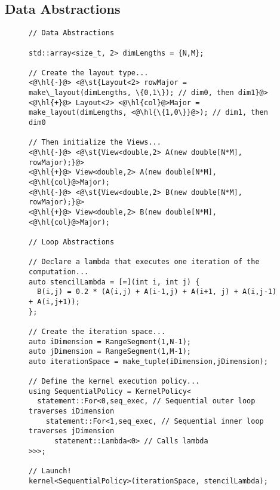 \subsection{Data Abstractions}
\begin{figure}
\begin{lstlisting}[caption={Diff for applying global layout transformations in RAJA version of 5-point stencil code. The new code uses column-major instead of row-major.}, label=stencilRAJADiff]
// Data Abstractions

std::array<size_t, 2> dimLengths = {N,M};

// Create the layout type...
<@\hl{-}@> <@\st{Layout<2> rowMajor = make\_layout(dimLengths, \{0,1\}); // dim0, then dim1}@>
<@\hl{+}@> Layout<2> <@\hl{col}@>Major = make_layout(dimLengths, <@\hl{\{1,0\}}@>); // dim1, then dim0

// Then initialize the Views...
<@\hl{-}@> <@\st{View<double,2> A(new double[N*M], rowMajor);}@>
<@\hl{+}@> View<double,2> A(new double[N*M], <@\hl{col}@>Major); 
<@\hl{-}@> <@\st{View<double,2> B(new double[N*M], rowMajor);}@>
<@\hl{+}@> View<double,2> B(new double[N*M], <@\hl{col}@>Major);

// Loop Abstractions

// Declare a lambda that executes one iteration of the computation...
auto stencilLambda = [=](int i, int j) {
  B(i,j) = 0.2 * (A(i,j) + A(i-1,j) + A(i+1, j) + A(i,j-1) + A(i,j+1));
};

// Create the iteration space...
auto iDimension = RangeSegment(1,N-1);
auto jDimension = RangeSegment(1,M-1);
auto iterationSpace = make_tuple(iDimension,jDimension);

// Define the kernel execution policy...
using SequentialPolicy = KernelPolicy<
  statement::For<0,seq_exec, // Sequential outer loop traverses iDimension
    statement::For<1,seq_exec, // Sequential inner loop traverses jDimension
      statement::Lambda<0> // Calls lambda
>>>;

// Launch!
kernel<SequentialPolicy>(iterationSpace, stencilLambda);
\end{lstlisting}
\end{figure}



